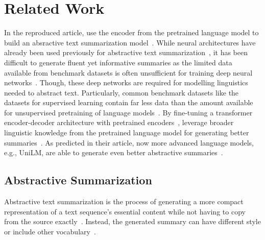\section{Related Work} %

In the reproduced article, \citeauthor{LiuL2019} use the encoder from the pretrained \Bert language model to build an absractive text summarization model~\cite{LiuL2019,DevlinCLT2019}.
While neural architectures have already been used previously for abstractive text summarization~\cite{NallapatiZSGX2016,SeeLM2017,PaulusXS2018}, it has been difficult to generate fluent yet informative summaries as the limited data available from benchmark datasets is often unsufficient for training deep neural networks~\cite{NallapatiZSGX2016}. Though, these deep networks are required for modelling linguistics needed to abstract text.
Particularly, common benchmark datasets like the \CnnDailyMail datasets for supervised learning contain far less data than the amount available for unsupervised pretraining of language models~\cite{HermannKGEKSB2015,DevlinCLT2019}.
By fine-tuning a transformer encoder-decoder architecture with pretrained encoders~\cite{VaswaniSPUJGKP2017,DevlinCLT2019}, \citeauthor{LiuL2019} leverage broader linguistic knowledge from the pretrained language model for generating better summaries~\cite{LiuL2019}.
As predicted in their article, now more advanced language models, e.g., UniLM, are able to generate even better abstractive summaries~\cite{DongWWLWGZH2019}.

\subsection{Abstractive Summarization}

Abstractive text summarization is the process of generating a more compact representation of a text sequence's essential content while not having to copy from the source exactly~\cite[28]{Torres-Moreno2014}. Instead, the generated summary can have different style or include other vocabulary~\cite{NallapatiZSGX2016}.


